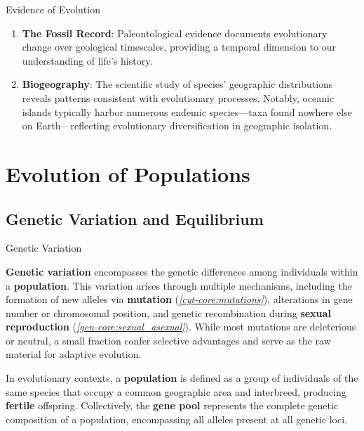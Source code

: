 \documentclass[10pt]{article}
\begin{document}
\begin{core}{Evidence of Evolution}
\begin{enumerate}
\begin{itemize}
            
          \end{itemize}

        \item \textbf{The Fossil Record}: Paleontological evidence documents evolutionary change over geological timescales, providing a temporal dimension to our understanding of life's history.

        \item \textbf{Biogeography}: The scientific study of species' geographic distributions reveals patterns consistent with evolutionary processes. Notably, oceanic islands typically harbor numerous endemic species---taxa found nowhere else on Earth---reflecting evolutionary diversification in geographic isolation.

      \end{enumerate}

    \end{core}

\section{Evolution of Populations}

  \subsection{Genetic Variation and Equilibrium}

    \begin{core}{Genetic Variation}

      \textbf{Genetic variation} encompasses the genetic differences among individuals within a \textbf{population}. This variation arises through multiple mechanisms, including the formation of new alleles via \textbf{mutation} (\textit{\autoref{cyt-core:mutations}}), alterations in gene number or chromosomal position, and genetic recombination during \textbf{sexual reproduction} (\textit{\autoref{gen-core:sexual_asexual}}). While most mutations are deleterious or neutral, a small fraction confer selective advantages and serve as the raw material for adaptive evolution.


      In evolutionary contexts, a \textbf{population} is defined as a group of individuals of the same species that occupy a common geographic area and interbreed, producing \textbf{fertile} offspring. Collectively, the \textbf{gene pool} represents the complete genetic composition of a population, encompassing all alleles present at all genetic loci.

    \end{core}
\end{document}
